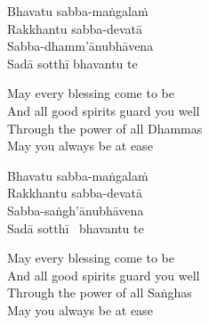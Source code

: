 \begin{pali-hang-continued}
  Bhavatu sabba-maṅgalaṁ\\
  Rakkhantu sabba-devatā\\
  Sabba-dhamm'ānubhāvena\\
  Sadā sotthī bhavantu te
\end{pali-hang-continued}

\begin{english-verses}
  May every blessing come to be\\
  And all good spirits guard you well\\
  Through the power of all Dhammas\\
  May you always be at ease
\end{english-verses}

\begin{pali-hang-continued}
  Bhavatu sabba-maṅgalaṁ\\
  Rakkhantu sabba-devatā\\
  Sabba-saṅgh'ānubhāvena\\
  Sadā sotthī \breathmark\ bhavantu te
\end{pali-hang-continued}

\begin{english-verses}
  May every blessing come to be\\
  And all good spirits guard you well\\
  Through the power of all Saṅghas\\
  May you always be at ease
\end{english-verses}

\suttaRef{[Trad]}


